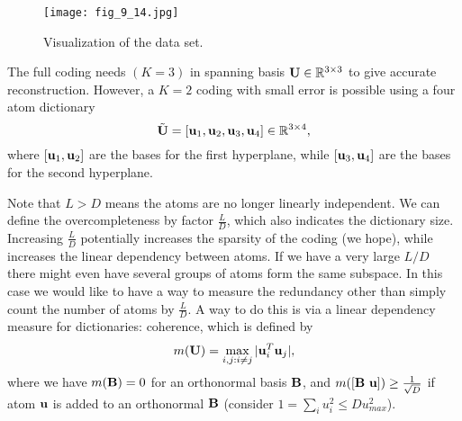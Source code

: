 \documentclass[../main.tex]{subfiles}
\begin{document}
\begin{figure}[h] 
	\centering 
	\texttt{[image: fig\_9\_14.jpg]} 
	\caption{Visualization of the data set.}\label{fig_9_14}
\end{figure}
\par The full coding needs $(K=3)$ in spanning basis ${\bf U}\in \mathbb{R}^{3\times 3}$ to give accurate reconstruction. However, a $K=2$ coding with small error is possible using a four atom dictionary
\begin{equation*}
\tilde{\bf U}=[{\bf u}_1,{\bf u}_2,{\bf u}_3,{\bf u}_4]\in \mathbb{R}^{3\times 4},
\end{equation*}
where $[{\bf u}_1,{\bf u}_2]$ are the bases for the first hyperplane, while $[{\bf u}_3,{\bf u}_4]$ are the bases for the second hyperplane. 
\par Note that $L>D$ means the atoms are no longer linearly independent. We can define the overcompleteness by factor $\frac{L}{D}$, which also indicates the dictionary size. Increasing $\frac{L}{D}$ potentially increases the sparsity of the coding (we hope), while increases the linear dependency between atoms. If we have a very large $L/D$ there might even have several groups of atoms form the same subspace.
In this case we would like to have a way to measure the redundancy other than simply count the number of atoms by $\frac{L}{D}$. A way to do this is via a linear dependency measure for dictionaries: coherence, which is defined by 
\begin{equation*}
m({\bf U})=\max_{i,j:i\neq j}|{\bf u}_i^T{\bf u}_j|,
\end{equation*}
where we have $m({\bf B})=0$ for an orthonormal basis ${\bf B}$, and $m([{\bf B}\ {\bf u}])\geq \frac{1}{\sqrt{D}}$ if atom ${\bf u}$ is added to an orthonormal ${\bf B}$ (consider $1=\sum_i u_i^2\leq D u_{max}^2$).  
\end{document}
